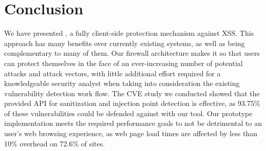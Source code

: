 \section{Conclusion}
We have presented \sys, a fully client-side protection mechanism against XSS. This approach has many benefits over currently existing systems, as well as being complementary to many of them. Our firewall architecture makes it so that users can protect themselves in the face of an ever-increasing number of potential attacks and attack vectors, with little additional effort required for a knowledgeable security analyst when taking into consideration the existing vulnerability detection work flow. The CVE study we conducted showed that the provided API for sanitization and injection point detection is effective, as 93.75\% of these vulnerabilities could be defended against with our tool. Our prototype implementation meets the required performance goals to not be detrimental to an user's web browsing experience, as web page load times are affected by less than 10\% overhead on 72.6\% of sites.
